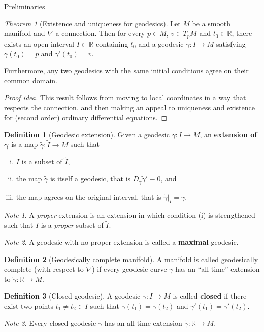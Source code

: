 \documentclass{article}
\newcommand{\fn}[3]{#1 \colon #2 \rightarrow #3}
\theoremstyle{definition}
\newtheorem{definition}{Definition}[section]
\theoremstyle{remark}
\newtheorem{remark}{Note}[section]
\newtheorem{theorem}{Theorem}[section]
\begin{document}
\begin{section}{Preliminaries}
  \begin{theorem}[Existence and uniqueness for geodesics] %
    Let $M$ be a smooth manifold and $\nabla$ a connection. Then for every
    $p \in M$, $v \in T_pM$ and $t_0 \in \mathbb R$, there exists an open
    interval $I \subset \mathbb R$ containing $t_0$ and a geodesic
    $\fn \gamma I M$ satisfying $\gamma(t_0) = p$ and $\gamma'(t_0) = v$.

    Furthermore, any two geodesics with the same initial conditions agree on
    their common domain.
  \end{theorem}
  \begin{proof}[Proof idea]
    This result follows from moving to local coordinates in a way that respects
    the connection, and then making an appeal to uniqueness and existence for
    (second order) ordinary differential equations.
  \end{proof}

  \begin{definition}[Geodesic extension]
    Given a geodesic $\fn \gamma I M$, an \textbf{extension of} $\boldsymbol{\gamma}$ is a map
    $\fn {\widetilde \gamma} {\widetilde I} M$ such that \begin{enumerate}[(i)]
      \item $I$ is a subset of $\widetilde I$,
      \item the map $\widetilde \gamma$ is itself a geodesic, that is $D_{\widetilde\gamma}{\widetilde\gamma'} \equiv 0$, and
      \item the map agrees on the original interval, that is $\widetilde \gamma|_I = \gamma$.
    \end{enumerate}
  \end{definition}
  \begin{remark}
    A \textit{proper} extension is an extension in which condition (i) is strengthened
    such that $I$ is a \textit{proper} subset of $\widetilde I$.
  \end{remark}
  \begin{remark}
    A geodesic with no proper extension is called a \textbf{maximal} geodesic.
  \end{remark}
  \begin{definition}[Geodesically complete manifold]
    A manifold is called geodesically complete (with respect to $\nabla$) if
    every geodesic curve $\gamma$ has an ``all-time'' extension to
    $\fn {\widetilde\gamma} {\mathbb R} {M}$.
  \end{definition}
  \begin{definition}[Closed geodesic]
    A geodesic $\fn \gamma I M$ is called \textbf{closed} if there exist
    two points $t_1 \neq t_2 \in I$ such that $\gamma(t_1) = \gamma(t_2)$ and
    $\gamma'(t_1) = \gamma'(t_2)$.
  \end{definition}
  \begin{remark}
    Every closed geodesic $\gamma$ has an all-time extension $\fn {\widetilde\gamma} {\mathbb R} {M}$.
  \end{remark}
\end{section}
\end{document}
